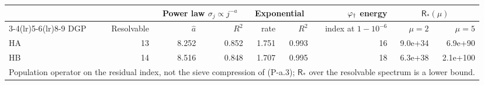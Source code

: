 \begin{tabular}{lrrrrrrrr}
\toprule
 & & \multicolumn{2}{c}{Power law $\sigma_j\propto j^{-a}$} & \multicolumn{2}{c}{Exponential} & $\varphi_{\dagger}$ energy & \multicolumn{2}{c}{$\mathsf R_\ast(\mu)$} \\
\cmidrule(lr){3-4}\cmidrule(lr){5-6}\cmidrule(lr){8-9}
DGP & Resolvable & $\hat a$ & $R^2$ & rate & $R^2$ & index at $1-10^{-6}$ & $\mu=2$ & $\mu=5$ \\
\midrule
HA & 13 & 8.252 & 0.852 & 1.751 & 0.993 & 16 & 9.0e+34 & 6.9e+90 \\
HB & 14 & 8.516 & 0.848 & 1.707 & 0.995 & 18 & 6.3e+38 & 2.1e+100 \\
\midrule
\multicolumn{9}{l}{Population operator on the residual index, not the sieve compression of (P-a.3); $\mathsf R_\ast$ over the resolvable spectrum is a lower bound.} \\
\bottomrule
\end{tabular}
